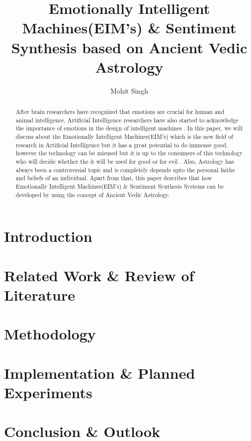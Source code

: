 \documentclass[12pt, a4paper, twocolumn, twoside]{article}
\title{Emotionally Intelligent Machines(EIM's) \& Sentiment Synthesis based on Ancient Vedic Astrology}
\author{Mohit Singh}
\begin{document}
	\maketitle
	\begin{abstract}
		After brain researchers have recognized that emotions are crucial for human and animal intelligence, Artificial Intelligence researchers have also started to acknowledge the importance of emotions in the design of intelligent machines \cite{atmos13081292}. In this paper, we will discuss about the Emotionally Intelligent Machines(EIM's) which is the new field of research in Artificial Intelligence but it has a great potential to do immense good, however the technology can be misused but it is up to the consumers of this technology who will decide whether the it will be used for good or for evil \cite{doi:10.1080/14755610.2022.2093234}. Also, Astrology has always been a controversial topic and is completely depends upto the personal faiths and beliefs of an individual. Apart from that, this paper describes that how Emotionally\cite{unknown} Intelligent Machines(EIM's) \& Sentiment Synthesis Systems can be developed by using the concept of Ancient Vedic Astrology.\cite{article}
	\end{abstract}
	\section{Introduction}
	\section{Related Work \& Review of Literature}
	\section{Methodology}
	\section{Implementation \& Planned Experiments}
	\section{Conclusion \& Outlook}
	
	
\end{document}
